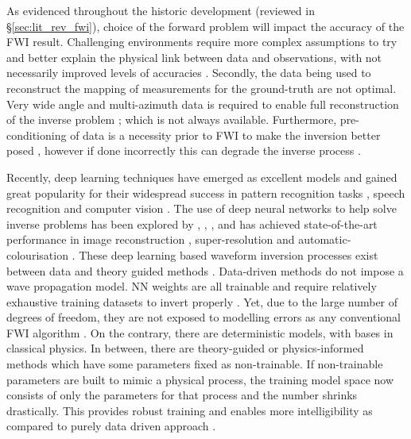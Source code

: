 As evidenced throughout the historic development (reviewed in §\ref{sec:lit_rev_fwi}), choice of the forward problem will impact the accuracy of the FWI result. Challenging environments require more complex assumptions to try and better explain the physical link between data and observations, with not necessarily improved levels of accuracies \citep{Morgan2013}. Secondly, the data being used to reconstruct the mapping of measurements for the ground-truth are not optimal. Very wide angle and multi-azimuth data is required to enable full reconstruction of the inverse problem \citep{Morgan2016}; which is not always available. Furthermore, pre-conditioning of data is a necessity prior to FWI to make the inversion better posed \citep{Kumar2012a,Mothi2013,Peng2018,Warner2013}, however if done incorrectly this can degrade the inverse process \citep{Lines2014}.

Recently, deep learning techniques have emerged as excellent models and gained great popularity for their widespread success in pattern recognition tasks \citep{Ciresan2011, Ciresan2012}, speech recognition \citep{Hinton2012} and  computer vision \citep{Krizhevsky2015,Deng2013}. The use of deep neural networks to help solve inverse problems has been explored by \cite{Elshafiey1991}, \cite{Adler2017a}, \cite{Chang2017}, \cite{Wei2017} and has achieved state-of-the-art performance in image reconstruction \citep{Kelly2017, Petersen2017, Adler2017b}, super-resolution \citep{Bruna2015, Galliani2017} and automatic-colourisation \citep{Larsson2016}. These deep learning based waveform inversion processes exist between data and theory guided methods \citep{Sun2019}. Data-driven methods do not impose a wave propagation model. \ac{NN} weights are all trainable and require relatively exhaustive training datasets to invert properly \citep{Sun2019a}. Yet, due to the large number of degrees of freedom, they are not exposed to modelling errors as any conventional FWI algorithm \citep{Wu2018,Li2019}. On the contrary, there are deterministic models, with bases in classical physics. In between, there are theory-guided or physics-informed methods which have some parameters fixed as non-trainable. If non-trainable parameters are built to mimic a physical process, the training model space now consists of only the parameters for that process and the number shrinks drastically. This provides robust training and enables more intelligibility as compared to purely data driven approach \citep{Biswas2019}.

